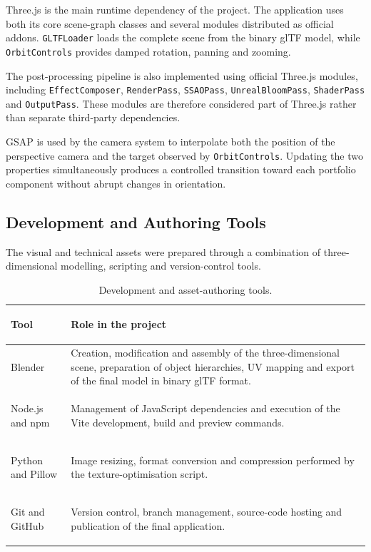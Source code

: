 \documentclass{report}
\begin{document}
Three.js is the main runtime dependency of the project. The application uses both its core scene-graph classes and several modules distributed
as official addons. \texttt{GLTFLoader} loads the complete scene from the binary glTF model, while \texttt{OrbitControls} provides damped
rotation, panning and zooming.

The post-processing pipeline is also implemented using official Three.js modules, including \texttt{EffectComposer}, \texttt{RenderPass}, \texttt{SSAOPass},
\texttt{UnrealBloomPass}, \texttt{ShaderPass} and \texttt{OutputPass}. These modules are therefore considered part of Three.js rather than separate third-party dependencies.

GSAP is used by the camera system to interpolate both the position of the perspective camera and the target observed by
\texttt{OrbitControls}. Updating the two properties simultaneously produces a controlled transition toward each portfolio component
without abrupt changes in orientation.
\subsection{Development and Authoring Tools}

The visual and technical assets were prepared through a combination of
three-dimensional modelling, scripting and version-control tools.

\begin{table}[ht]
    \centering
    \small
    \setlength{\tabcolsep}{7pt}
    \renewcommand{\arraystretch}{1.25}

    \begin{tabularx}{\textwidth}{
        @{}
        >{\bfseries\raggedright\arraybackslash}p{}
        >{\raggedright\arraybackslash}X
        @{}
    }
        \toprule
        Tool & Role in the project \\
        \midrule

        Blender
        &
        Creation, modification and assembly of the three-dimensional
        scene, preparation of object hierarchies, UV mapping and export
        of the final model in binary glTF format.
        \\

        Node.js and npm
        &
        Management of JavaScript dependencies and execution of the Vite
        development, build and preview commands.
        \\

        Python and Pillow
        &
        Image resizing, format conversion and compression performed by
        the texture-optimisation script.
        \\

        Git and GitHub
        &
        Version control, branch management, source-code hosting and
        publication of the final application.
        \\

        \bottomrule
    \end{tabularx}

    \caption{Development and asset-authoring tools.}
    \label{tab:development-tools}
\end{table}
\end{document}
